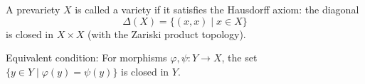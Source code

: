 A prevariety $X$ is called a variety if it satisfies the Hausdorff axiom: the diagonal
$$\Delta(X) = \{(x, x) \mid x \in X\}$$
is closed in $X \times X$ (with the Zariski product topology).

Equivalent condition: For morphisms $\varphi, \psi: Y \rightarrow X$, the set $\{y \in Y \mid \varphi(y) = \psi(y)\}$ is closed in $Y$.
